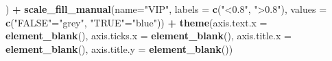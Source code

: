 \documentclass[
]{book}
\newenvironment{Shaded}{\begin{snugshade}}{\end{snugshade}}
\newcommand{\DataTypeTok}[1]{\textcolor[rgb]{0.13,0.29,0.53}{#1}}
\newcommand{\KeywordTok}[1]{\textcolor[rgb]{0.13,0.29,0.53}{\textbf{#1}}}
\newcommand{\NormalTok}[1]{#1}
\newcommand{\OperatorTok}[1]{\textcolor[rgb]{0.81,0.36,0.00}{\textbf{#1}}}
\newcommand{\StringTok}[1]{\textcolor[rgb]{0.31,0.60,0.02}{#1}}
\begin{document}
\begin{Shaded}
\begin{Highlighting}[]
\NormalTok{          ) }\OperatorTok{+}
\StringTok{    }\KeywordTok{scale_fill_manual}\NormalTok{(}\DataTypeTok{name=}\StringTok{"VIP"}\NormalTok{, }
                      \DataTypeTok{labels =} \KeywordTok{c}\NormalTok{(}\StringTok{"<0.8"}\NormalTok{, }\StringTok{">0.8"}\NormalTok{), }
                      \DataTypeTok{values =} \KeywordTok{c}\NormalTok{(}\StringTok{"FALSE"}\NormalTok{=}\StringTok{"grey"}\NormalTok{, }\StringTok{"TRUE"}\NormalTok{=}\StringTok{"blue"}\NormalTok{)) }\OperatorTok{+}
\StringTok{    }\KeywordTok{theme}\NormalTok{(}\DataTypeTok{axis.text.x =} \KeywordTok{element_blank}\NormalTok{(),}
          \DataTypeTok{axis.ticks.x =} \KeywordTok{element_blank}\NormalTok{(),}
          \DataTypeTok{axis.title.x =} \KeywordTok{element_blank}\NormalTok{(),}
          \DataTypeTok{axis.title.y =} \KeywordTok{element_blank}\NormalTok{())}
  

\end{Highlighting}
\end{Shaded}
\end{document}

